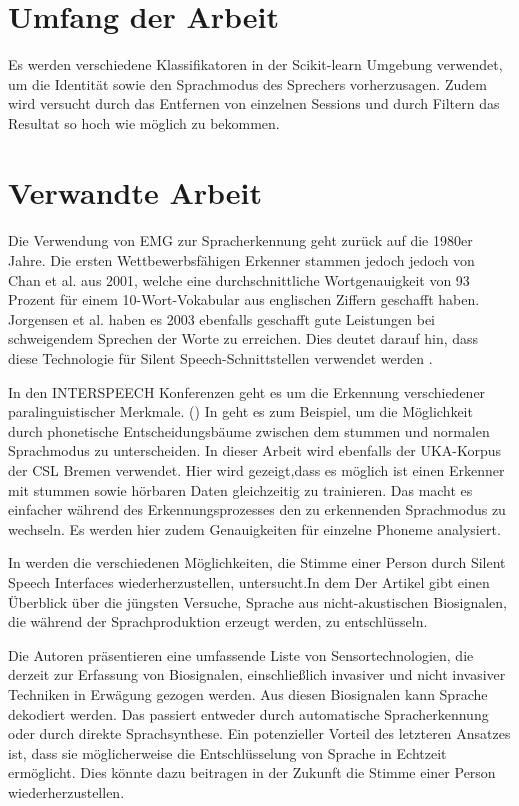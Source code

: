 \section{Umfang der Arbeit}
Es werden verschiedene Klassifikatoren in der Scikit-learn Umgebung verwendet, um die Identität sowie den Sprachmodus des Sprechers vorherzusagen. Zudem wird versucht durch das Entfernen von einzelnen Sessions und durch Filtern das Resultat so hoch wie möglich zu bekommen.


\section{Verwandte Arbeit}
\paragraph{}
Die Verwendung von EMG zur Spracherkennung geht zurück auf
die 1980er Jahre. Die ersten Wettbewerbsfähigen Erkenner stammen jedoch jedoch von Chan et al. aus 2001, welche eine durchschnittliche Wortgenauigkeit von 93 Prozent für einem 10-Wort-Vokabular aus englischen Ziffern geschafft haben. Jorgensen et al. haben es 2003 ebenfalls geschafft gute Leistungen bei schweigendem Sprechen der Worte zu erreichen. Dies deutet darauf hin, dass diese Technologie
für Silent Speech-Schnittstellen verwendet werden \cite{inproceedings}.

In den INTERSPEECH Konferenzen geht es um die Erkennung verschiedener paralinguistischer Merkmale. (\cite{ISCA2020-SP})
In \cite{janke2011investigations} geht es zum Beispiel, um die Möglichkeit durch phonetische Entscheidungsbäume zwischen dem stummen und normalen Sprachmodus zu unterscheiden. In dieser Arbeit wird ebenfalls der UKA-Korpus der CSL Bremen verwendet. Hier wird gezeigt,dass es möglich ist einen Erkenner mit stummen sowie hörbaren Daten gleichzeitig zu trainieren. Das macht es einfacher während des Erkennungsprozesses den zu erkennenden Sprachmodus zu wechseln. Es werden hier zudem Genauigkeiten für einzelne Phoneme analysiert.

In \cite{article} werden die verschiedenen Möglichkeiten, die Stimme einer Person durch Silent Speech Interfaces wiederherzustellen, untersucht.In dem Der Artikel gibt  einen Überblick über die jüngsten Versuche, Sprache aus nicht-akustischen Biosignalen, die während der Sprachproduktion erzeugt werden, zu entschlüsseln.
 
Die Autoren präsentieren eine umfassende Liste von Sensortechnologien, die derzeit zur Erfassung von Biosignalen, einschließlich invasiver und nicht invasiver Techniken in Erwägung gezogen werden. Aus diesen Biosignalen kann Sprache dekodiert werden. Das passiert entweder durch automatische Spracherkennung oder durch direkte
Sprachsynthese. Ein potenzieller Vorteil des letzteren Ansatzes
ist, dass sie möglicherweise die Entschlüsselung von Sprache in Echtzeit ermöglicht. Dies könnte dazu beitragen in der Zukunft die Stimme einer Person wiederherzustellen. 

